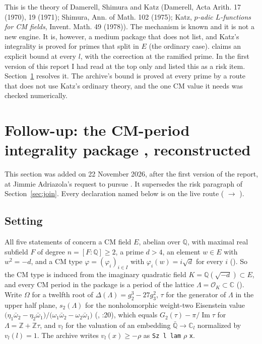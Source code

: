 \documentclass[11pt]{article}
\theoremstyle{remark}
\begin{document}
This is the theory of Damerell, Shimura and Katz (Damerell, Acta Arith. 17 (1970), 19 (1971); Shimura, Ann. of Math. 102 (1975); Katz, \emph{$p$-adic $L$-functions for CM fields}, Invent. Math. 49 (1978)). The mechanism is known and it is not a new engine. It is, however, a medium package that  does not list, and Katz's integrality is proved for primes that split in $E$ (the ordinary case).  claims an explicit bound at every $l$, with the correction  at the ramified prime. In the first version of this report I had read  at the top only and listed this as a risk item. Section~\ref{sec:joinfull} resolves it. The archive's bound is proved at every prime by a route that does not use Katz's ordinary theory, and the one CM value it needs was checked numerically.

\section{Follow-up: the CM-period integrality package , reconstructed}\label{sec:joinfull}

This section was added on 22 November 2026, after the first version of the report, at Jimmie Adriazola's request to pursue . It supersedes the risk paragraph of Section~\ref{sec:join}. Every declaration named below is on the live route ( $\to$ ).

\subsection{Setting}

All five statements of  concern a CM field $E$, abelian over $\mathbb Q$, with maximal real subfield $F$ of degree $n=[F:\mathbb Q]\ge2$, a prime $d>4$, an element $w\in E$ with $w^2=-d$, and a CM type $\varphi=(\varphi_i)_{i\in I}$ with $\varphi_i(w)=i\sqrt d$ for every $i$ (). So the CM type is induced from the imaginary quadratic field $K=\mathbb Q(\sqrt{-d})\subset E$, and every CM period in the package is a period of the lattice $\Lambda=\mathcal O_K\subset\mathbb C$ (). Write $\Omega$ for a twelfth root of $\Delta(\Lambda)=g_2^3-27g_3^2$, $\tau$ for the generator of $\Lambda$ in the upper half plane, $s_2(\Lambda)$ for the nonholomorphic weight-two Eisenstein value $\bigl(\eta_1\bar\omega_2-\eta_2\bar\omega_1\bigr)/\bigl(\omega_1\bar\omega_2-\omega_2\bar\omega_1\bigr)$ (, :20), which equals $G_2(\tau)-\pi/\operatorname{Im}\tau$ for $\Lambda=\mathbb Z+\mathbb Z\tau$, and $v_l$ for the valuation of an embedding $\bar{\mathbb Q}\to\mathbb C_l$ normalized by $v_l(l)=1$. The archive writes $v_l(x)\ge-\rho$ as \texttt{Sz l lam} $\rho$ \texttt{x}.
\end{document}
